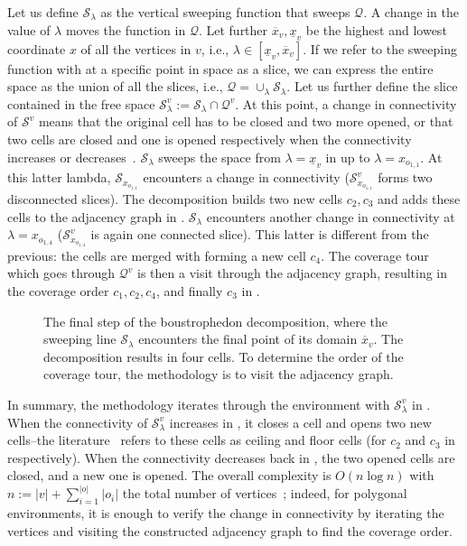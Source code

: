 Let us define $\mathcal{S}_\lambda$ as the vertical sweeping function that sweeps $\mathcal{Q}$. A change in the value of $\lambda$ moves the function in $\mathcal{Q}$. Let further $\overline{x}_v,\underline{x}_v$ be the highest and lowest coordinate $x$ of all the vertices in $v$, i.e., $\lambda\in[\underline{x}_v,\overline{x}_v]$. If we refer to the sweeping function with at a specific point in space as a slice, we can express the entire space as the union of all the slices, i.e., $\mathcal{Q}=\cup_{\lambda}\mathcal{S}_\lambda$. Let us further define the slice contained in the free space $\mathcal{S}^v_\lambda:=\mathcal{S}_\lambda\cap\mathcal{Q}^{v}$.
At this point, a change in connectivity of $\mathcal{S}^v$ means that the original cell has to be closed and two more opened, or that two cells are closed and one is opened respectively when the connectivity increases or decreases~\citep{choset2000exact}. 
$\mathcal{S}_\lambda$ sweeps the space from $\lambda=\underline{x}_v$ in  up to $\lambda=x_{o_{1,1}}$. At this latter lambda, $\mathcal{S}_{x_{o_{1,1}}}$ encounters a change in connectivity ($\mathcal{S}^v_{x_{o_{1,1}}}$ forms two disconnected slices). The decomposition builds two new cells $c_2,c_3$ and adds these cells to the adjacency graph in . $\mathcal{S}_\lambda$ encounters another change in connectivity at $\lambda=x_{o_{1,4}}$ ($\mathcal{S}^v_{x_{o_{1,4}}}$ is again one connected slice). This latter is different from the previous: the cells are merged with forming a new cell $c_4$. The coverage tour which goes through $\mathcal{Q}^v$ is then a visit through the adjacency graph, resulting in the coverage order $c_1,c_2,c_4$, and finally $c_3$ in .  

\begin{figure}[h]
  \centering
  \selectfont
  
  \caption[Result of the boustrophedon decomposition]{The final step of the boustrophedon decomposition, where the sweeping line $\mathcal{S}_{\lambda}$ encounters the final point of its domain $\overline{x}_v$. The decomposition results in four cells. To determine the order of the coverage tour, the methodology is to  visit the adjacency graph.}
  \label{fig:bcd4}
\end{figure}
In summary, the methodology iterates through the environment with $\mathcal{S}^v_{\lambda}$ in . When the connectivity of $\mathcal{S}^v_{\lambda}$ increases in , it closes a cell and opens two new cells--the literature~\citep{choset2000exact,choset2005principles} refers to these cells as ceiling and floor cells (for $c_2$ and $c_3$ in~ respectively). When the connectivity decreases back in , the two opened cells are closed, and a new one is opened. The overall complexity is $O(n\log{n})$ with $n:=|v|+\sum_{i=1}^{|o|}|o_i|$ the total number of vertices~\citep{choset2000exact}; indeed, for polygonal environments, it is enough to verify the change in connectivity by iterating the vertices and visiting the constructed adjacency graph to find the coverage order. 

